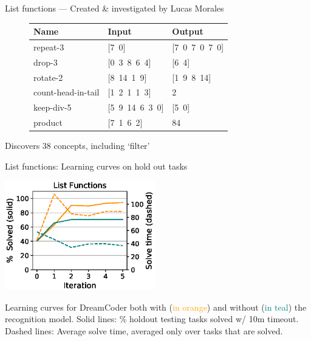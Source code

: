 \documentclass{beamer}
\newcommand{\orange}[1]{\textcolor{orange}{#1}}
\newcommand{\teal}[1]{\textcolor{teal}{#1}}
\begin{document}
\begin{frame}{List functions --- \small{Created \& investigated by Lucas
  Morales}}


  \vspace{1cm}
  
  \begin{figure}[b]\centering
\vspace{-0.5cm}  \begin{tabular}{lll}
    \toprule
    Name & Input & Output \\\midrule
    repeat-3 & [7\, 0] & [7\, 0\, 7\, 0\, 7\, 0] \\
    drop-3 & [0\, 3\, 8\, 6\, 4] & [6\, 4] \\
    rotate-2 & [8\, 14\, 1\, 9] & [1\, 9\, 8\, 14] \\
    count-head-in-tail & [1\, 2\, 1\, 1\, 3] & 2 \\
    keep-div-5 & [5\, 9\, 14\, 6\, 3\, 0] & [5\, 0] \\
    product & [7\, 1\, 6\, 2] & 84 \\
    \bottomrule
  \end{tabular}
\end{figure}

  Discovers 38 concepts, including `filter'
\end{frame}

\begin{frame}{List functions: Learning curves on hold out tasks}

  \begin{center}
      \includegraphics[width = 6.5cm]{figures/listLearningCurve.eps} 
    \end{center}

Learning curves for DreamCoder both with (\orange{in orange}) and without
    (\teal{in teal}) the recognition model. Solid lines: \% holdout testing tasks solved w/ 10m timeout. Dashed lines: Average solve time, averaged only over tasks that are solved.


  \end{frame}
\end{document}
